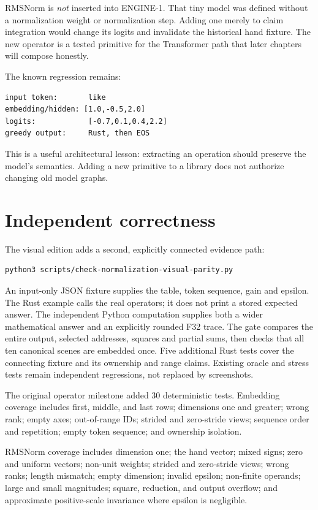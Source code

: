 RMSNorm is \emph{not} inserted into ENGINE-1. That tiny model was
defined without a normalization weight or normalization step. Adding one
merely to claim integration would change its logits and invalidate the
historical hand fixture. The new operator is a tested primitive for the
Transformer path that later chapters will compose honestly.

The known regression remains:

\begin{verbatim}
input token:       like
embedding/hidden: [1.0,-0.5,2.0]
logits:            [-0.7,0.1,0.4,2.2]
greedy output:     Rust, then EOS
\end{verbatim}

This is a useful architectural lesson: extracting an operation should
preserve the model's semantics. Adding a new primitive to a library does
not authorize changing old model graphs.

\section{Independent correctness}\label{independent-correctness}

The visual edition adds a second, explicitly connected evidence path:

\begin{verbatim}
python3 scripts/check-normalization-visual-parity.py
\end{verbatim}

An input-only JSON fixture supplies the table, token sequence, gain and
epsilon. The Rust example calls the real operators; it does not print a
stored expected answer. The independent Python computation supplies both
a wider mathematical answer and an explicitly rounded F32 trace. The
gate compares the entire output, selected addresses, squares and partial
sums, then checks that all ten canonical scenes are embedded once. Five
additional Rust tests cover the connecting fixture and its ownership and
range claims. Existing oracle and stress tests remain independent
regressions, not replaced by screenshots.

The original operator milestone added 30 deterministic tests. Embedding
coverage includes first, middle, and last rows; dimensions one and
greater; wrong rank; empty axes; out-of-range IDs; strided and
zero-stride views; sequence order and repetition; empty token sequence;
and ownership isolation.

RMSNorm coverage includes dimension one; the hand vector; mixed signs;
zero and uniform vectors; non-unit weights; strided and zero-stride
views; wrong ranks; length mismatch; empty dimension; invalid epsilon;
non-finite operands; large and small magnitudes; square, reduction, and
output overflow; and approximate positive-scale invariance where epsilon
is negligible.

